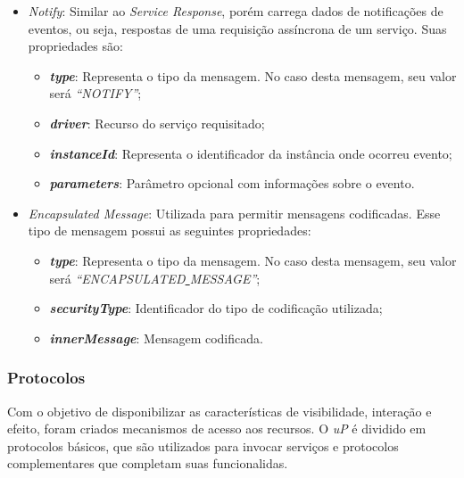 \begin{itemize}
\begin{itemize}
		\end{itemize}
	\item \emph{Notify}: Similar ao \emph{Service Response}, porém carrega dados de notificações de eventos, ou seja, respostas de uma requisição assíncrona de um serviço. Suas propriedades são:
		\begin{itemize}
			\item \emph{\bf{type}}: Representa o tipo da mensagem. No caso desta mensagem, seu valor será \emph{``NOTIFY''};
			\item \emph{\bf{driver}}: Recurso do serviço requisitado;
			\item \emph{\bf{instanceId}}: Representa o identificador da instância onde ocorreu evento;
			\item \emph{\bf{parameters}}: Parâmetro opcional com informações sobre o evento.
		\end{itemize}
	\item \emph{Encapsulated Message}: Utilizada para permitir mensagens codificadas. Esse tipo de mensagem possui as seguintes propriedades:
		\begin{itemize}
			\item \emph{\bf{type}}: Representa o tipo da mensagem. No caso desta mensagem, seu valor será \emph{``ENCAPSULATED\underline{ }MESSAGE''};
			\item \emph{\bf{securityType}}: Identificador do tipo de codificação utilizada;
			\item \emph{\bf{innerMessage}}: Mensagem codificada.
		\end{itemize}
\end{itemize}

\subsubsection{Protocolos}

Com o objetivo de disponibilizar as características de visibilidade, interação e efeito, foram criados mecanismos de acesso aos recursos. O \emph{uP} é dividido em protocolos básicos, que são utilizados para invocar serviços e protocolos complementares que completam suas  funcionalidas.

